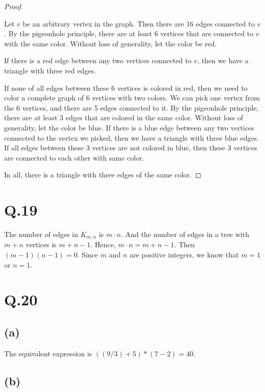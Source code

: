 \documentclass[a4paper,12pt]{article}
\begin{document}
\begin{proof}
$ $

Let $v$ be an arbitrary vertex in the graph.
Then there are 16 edges connected to $v$.
By the pigeonhole principle, there are at least 6 vertices that are connected to $v$ with the same color.
Without loss of generality, let the color be red.

If there is a red edge between any two vertices connected to $v$, then we have a triangle with three red edges.

If none of all edges between these 6 vertices is colored in red, then we need to color a complete graph of 6 vertices with two colors.
We can pick one vertex from the 6 vertices, and there are 5 edges connected to it.
By the pigeonhole principle, there are at least 3 edges that are colored in the same color.
Without loss of generality, let the color be blue.
If there is a blue edge between any two vertices connected to the vertex we picked, then we have a triangle with three blue edges.
If all edges between these 3 vertices are not colored in blue, then these 3 vertices are connected to each other with same color.

In all, there is a triangle with three edges of the same color.
\end{proof}

\section*{Q.19}

The number of edges in $K_{m,n}$ is $m \cdot n$.
And the number of edges in a tree with $m+n$ vertices is $m+n-1$.
Hence, $m \cdot n = m+n-1$.
Then $(m-1)(n-1) = 0$.
Since $m$ and $n$ are positive integers, we know that $m = 1$ or $n = 1$.

\section*{Q.20}

\subsection*{(a)}

The equivalent expression is $((9 / 3) + 5) * (7 - 2) = 40$.

\subsection*{(b)}
\end{document}

